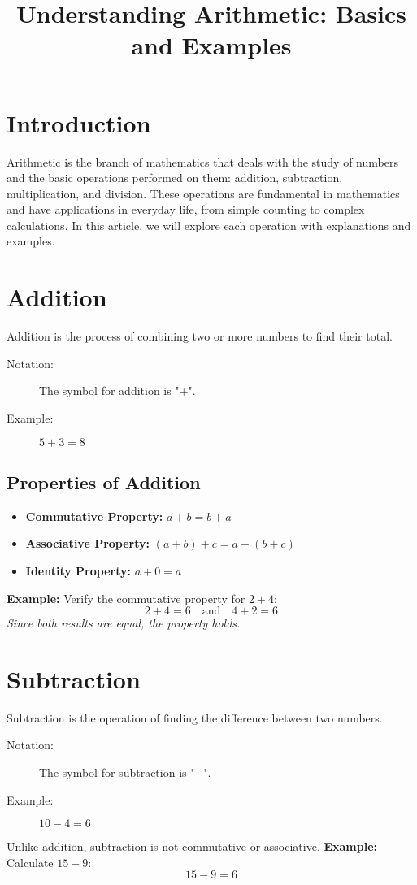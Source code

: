 \documentclass{article}
\title{Understanding Arithmetic: Basics and Examples}
\author{}
\date{}
\begin{document}
\maketitle

\section*{Introduction}
Arithmetic is the branch of mathematics that deals with the study of numbers and the basic operations performed on them: addition, subtraction, multiplication, and division. These operations are fundamental in mathematics and have applications in everyday life, from simple counting to complex calculations. In this article, we will explore each operation with explanations and examples.

\section{Addition}
Addition is the process of combining two or more numbers to find their total.
\begin{description}
    \item[Notation:] The symbol for addition is "+".
    \item[Example:] $5 + 3 = 8$
\end{description}
\subsection*{Properties of Addition}
\begin{itemize}
    \item \textbf{Commutative Property:} $a + b = b + a$
    \item \textbf{Associative Property:} $(a + b) + c = a + (b + c)$
    \item \textbf{Identity Property:} $a + 0 = a$
\end{itemize}
\textbf{Example:} Verify the commutative property for $2 + 4$:
\[2 + 4 = 6 \quad \text{and} \quad 4 + 2 = 6\]
\textit{Since both results are equal, the property holds.}

\section{Subtraction}
Subtraction is the operation of finding the difference between two numbers.
\begin{description}
    \item[Notation:] The symbol for subtraction is "\(-\)".
    \item[Example:] $10 - 4 = 6$
\end{description}
Unlike addition, subtraction is not commutative or associative.
\textbf{Example:} Calculate $15 - 9$:
\[15 - 9 = 6\]
\end{document}
